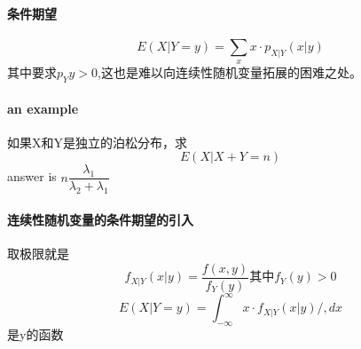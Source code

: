 \documentclass[12pt,a4paper]{ctexart}
\begin{document}
\paragraph{条件期望}
\[ E \left(X|Y=y\right)=\sum_{x} x \cdot p_{X|Y} 
\left(x|y\right)
\]
其中要求$ p_Y{y} >0$,这也是难以向连续性随机变量拓展的困难之处。

\paragraph{an example}
如果X和Y是独立的泊松分布，求\[ E \left(X|X+Y=n\right) \]
answer is $ n \dfrac{\lambda _{1}}{\lambda _{2}+\lambda_{1}} $

\paragraph{连续性随机变量的条件期望的引入}
取极限就是
\[ f_{X|Y} \left(x|y\right)=\dfrac{f \left(x,y\right)}{f_Y \left(y\right)}其中f_Y \left(y\right)>0\]
\[ E \left(X|Y=y\right)=\int_{-\infty}^{\infty} x \cdot f_{X|Y} \left(x|y\right) /, dx \]
是y的函数
\end{document}
